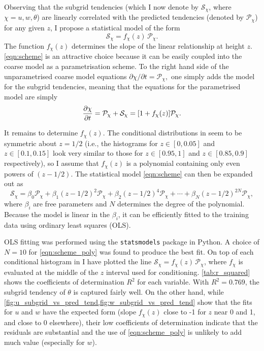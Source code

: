 \documentclass[../main.tex]{subfiles}
\begin{document}
Observing that the subgrid tendencies (which I now denote by
$\mathcal{S}_\chi$, where $\chi = u, w, \theta$) are linearly correlated with
the predicted tendencies (denoted by $\mathcal{P}_\chi$) for any given $z$, I
propose a statistical model of the form
\begin{equation} \label{eqn:scheme}
    \mathcal{S}_\chi =  f_\chi(z)\,\mathcal{P}_\chi.
\end{equation}
The function $f_\chi(z)$ determines the slope of the linear relationship at
height $z$. \cref{eqn:scheme} is an attractive choice because it can be easily
coupled into the coarse model as a parametrisation scheme. To the right hand
side of the unparametrised coarse model equations $\partial \chi/\partial t =
\mathcal{P}_\chi,$ one simply adds the model for the subgrid tendencies,
meaning that the equations for the parametrised model are simply
\begin{equation} \label{eqn:res_tend_parametrised_model}
    \frac{\partial \chi}{\partial t} = \mathcal{P}_\chi + \mathcal{S}_\chi
        = [1 + f_\chi(z)] \mathcal{P}_\chi.
\end{equation}

It remains to determine $f_\chi(z)$. The conditional distributions in
seem to be symmetric about $z=1/2$ (i.e., the histograms for $z \in [0, 0.05]$
and $z \in [0.1, 0.15]$ look very similar to those for $z \in [0.95, 1]$ and $z
\in [0.85, 0.9]$ respectively), so I assume that $f_\chi(z)$ is a polynomial
containing only even powers of $(z - 1/2)$. The statistical model
\cref{eqn:scheme} can then be expanded out as
\begin{equation} \label{eqn:scheme_poly}
    \mathcal{S}_\chi =
        \beta_0 \mathcal{P}_\chi + \beta_1 (z - 1/2)^2 \mathcal{P}_\chi
        + \beta_2 (z - 1/2)^4 \mathcal{P}_\chi + \cdots
        + \beta_N (z - 1/2)^{2N} \mathcal{P}_\chi,
\end{equation}
where $\beta_i$ are free parameters and $N$ determines the degree of the
polynomial. Because the model is linear in the $\beta_i$, it can be
efficiently fitted to the training data using ordinary least squares (OLS).

OLS fitting was performed using the \texttt{statsmodels} package in Python. A
choice of $N = 10$ for \cref{eqn:scheme_poly} was found to produce the best
fit. On top of each conditional histogram in
I have plotted the line $\mathcal{S}_\chi =  f_\chi(z)\,\mathcal{P}_\chi$,
where $f_\chi$ is evaluated at the middle of the $z$ interval used for
conditioning. \cref{tab:r_squared} shows the coefficients of determination
$R^2$ for each variable. With $R^2 = 0.769$, the subgrid tendency of $\theta$
is captured fairly well. On the other hand, while
\cref{fig:u_subgrid_vs_pred_tend,fig:w_subgrid_vs_pred_tend} show that the fits
for $u$ and $w$ have the expected form (slope $f_\chi(z)$ close to -1 for $z$
near 0 and 1, and close to 0 elsewhere), their low coefficients of
determination indicate that the residuals are substantial and the use of
\cref{eqn:scheme_poly} is unlikely to add much value (especially for $w$).
\end{document}
